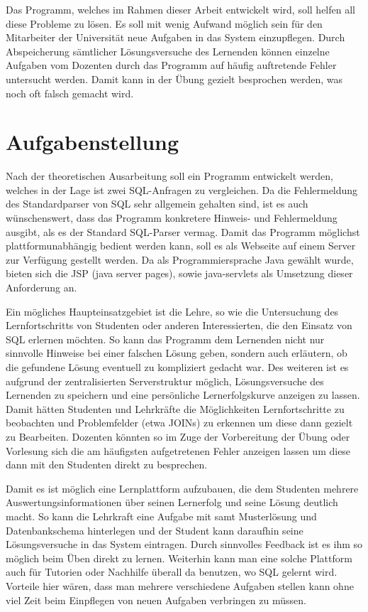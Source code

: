 Das Programm, welches im Rahmen dieser Arbeit entwickelt wird, soll helfen all diese Probleme zu lösen. Es soll mit wenig Aufwand möglich sein für den Mitarbeiter der Universität neue Aufgaben in das System einzupflegen. Durch Abspeicherung sämtlicher Lösungsversuche des Lernenden können einzelne Aufgaben vom Dozenten durch das Programm auf häufig auftretende Fehler untersucht werden. Damit kann in der Übung gezielt besprochen werden, was noch oft falsch gemacht wird.

\section{Aufgabenstellung}

Nach der theoretischen Ausarbeitung soll ein Programm entwickelt werden, welches in der Lage ist zwei SQL-Anfragen zu vergleichen. Da die Fehlermeldung des Standardparser von SQL sehr allgemein gehalten sind, ist es auch wünschenswert, dass das Programm konkretere Hinweis- und Fehlermeldung ausgibt, als es der Standard SQL-Parser vermag. Damit das Programm möglichst plattformunabhängig bedient werden kann, soll es als Webseite auf einem Server zur Verfügung gestellt werden. Da als Programmiersprache Java gewählt wurde, bieten sich die JSP (java server pages), sowie java-servlets als Umsetzung dieser Anforderung an.

Ein mögliches Haupteinsatzgebiet ist die Lehre, so wie die Untersuchung des Lernfortschritts von Studenten oder anderen Interessierten, die den Einsatz von SQL erlernen möchten. So kann das Programm dem Lernenden nicht nur sinnvolle Hinweise bei einer falschen Lösung geben, sondern auch erläutern, ob die gefundene Lösung eventuell zu kompliziert gedacht war. Des weiteren ist es aufgrund der zentralisierten Serverstruktur möglich, Lösungsversuche des Lernenden zu speichern und eine persönliche Lernerfolgskurve anzeigen zu lassen. Damit hätten Studenten und Lehrkräfte die Möglichkeiten Lernfortschritte zu beobachten und Problemfelder (etwa JOINs) zu erkennen um diese dann gezielt zu Bearbeiten. Dozenten könnten so im Zuge der Vorbereitung der Übung oder Vorlesung sich die am häufigsten aufgetretenen Fehler anzeigen lassen um diese dann mit den Studenten direkt zu besprechen.

Damit es ist möglich eine Lernplattform aufzubauen, die dem Studenten mehrere Auswertungsinformationen über seinen Lernerfolg und seine Lösung deutlich macht. So kann die Lehrkraft eine Aufgabe mit samt Musterlösung und Datenbankschema hinterlegen und der Student kann daraufhin seine Lösungsversuche in das System eintragen. Durch sinnvolles Feedback ist es ihm so möglich beim Üben direkt zu lernen. Weiterhin kann man eine solche Plattform auch für Tutorien oder Nachhilfe überall da benutzen, wo SQL gelernt wird. Vorteile hier wären, dass man mehrere verschiedene Aufgaben stellen kann ohne viel Zeit beim Einpflegen von neuen Aufgaben verbringen zu müssen.

